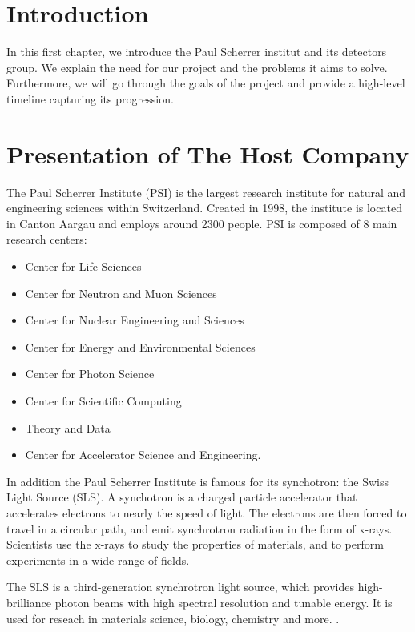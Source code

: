 \begin{spacing}{1.2}

    \section*{Introduction}
    In this first chapter, we introduce the Paul Scherrer institut and its detectors group.
    We explain the need for our project and the problems it aims to solve. Furthermore,
    we will go through the goals of the project and provide a high-level timeline
    capturing its progression.

    \section{Presentation of The Host Company}
    The Paul Scherrer Institute (PSI) is the largest research institute for natural and engineering sciences within Switzerland.
    Created in 1998, the institute is located in Canton Aargau and employs around 2300 people.
    PSI is composed of 8 main research centers:
    \begin{itemize}
        \item Center for Life Sciences
        \item Center for Neutron and Muon Sciences
        \item Center for Nuclear Engineering and Sciences
        \item Center for Energy and Environmental Sciences
        \item Center for Photon Science
        \item Center for Scientific Computing
        \item Theory and Data
        \item Center for Accelerator Science and Engineering.
    \end{itemize}

    In addition the Paul Scherrer Institute is famous for its synchotron: the Swiss Light Source (SLS).
    A synchotron is a charged particle accelerator that accelerates electrons to nearly the speed of light. The electrons are then
    forced to travel in a circular path, and emit synchrotron radiation in the form of x-rays.
    Scientists use the x-rays to study the properties of materials, and to perform experiments in a wide range of fields.
    
    The SLS is a third-generation synchrotron light source, which provides high-brilliance photon beams
    with high spectral resolution and tunable energy. It is used for reseach in materials science,
    biology, chemistry and more. \cite{boge2002first, aboutSLS, PhysRevLett.128.024801}.


\end{spacing}
